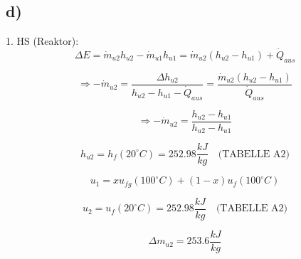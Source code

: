 

\subsection*{d)}
1. HS (Reaktor): \[\Delta E = \dot{m}_{u2} h_{u2} - \dot{m}_{u1} h_{u1} = \dot{m}_{u2} (h_{u2} - h_{u1}) + \dot{Q}_{aus}\]

\[
\Rightarrow -\dot{m}_{u2} = \frac{\Delta h_{u2}}{h_{u2} - h_{u1} - \dot{Q}_{aus}} = \frac{\dot{m}_{u2} (h_{u2} - h_{u1})}{\dot{Q}_{aus}}
\]

\[
\Rightarrow -\dot{m}_{u2} = \frac{h_{u2} - h_{u1}}{h_{u2} - h_{u1}}
\]

\[
h_{u2} = h_{f} (20^\circ C) = 252.98 \frac{kJ}{kg} \quad \text{(TABELLE A2)}
\]

\[
u_{1} = x u_{fg} (100^\circ C) + (1 - x) u_{f} (100^\circ C)
\]

\[
u_{2} = u_{f} (20^\circ C) = 252.98 \frac{kJ}{kg} \quad \text{(TABELLE A2)}
\]

\[
\Delta m_{u2} = 253.6 \frac{kJ}{kg}
\]